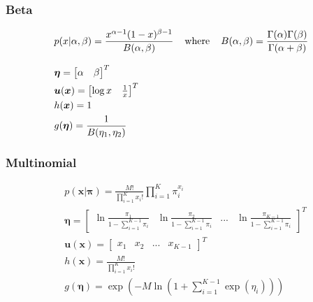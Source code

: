 \subsubsection{Beta}
\begin{fleqn}[\parindent]
	\begin{equation*}
	\begin{split}
	& p(x|\alpha, \beta) = \frac{x^{\alpha-1}(1 - x)^{\beta-1}}{B(\alpha, \beta)} \hspace{4mm}\text{where}\hspace{4mm}B(\alpha, \beta)=\frac{\Gamma(\alpha)\Gamma(\beta)}{\Gamma(\alpha + \beta)}\\[8pt]
	& \bm{\eta} = \begin{bmatrix}
	\alpha & \beta\\
	\end{bmatrix}^T\\
	& \bm{u}(\bm{x}) = \begin{bmatrix}
	\log x & \frac{1}{x}\\
	\end{bmatrix}^T\\
	& h(\bm{x}) = 1\\
	& g(\bm{\eta}) = \frac{1}{B(\eta_1, \eta_2)}\\
	\end{split}
	\end{equation*}
\end{fleqn}
\subsubsection{Multinomial}
\begin{fleqn}[\parindent]
	\begin{equation*}
	\begin{split}
	& p(\bm{x}|\bm{\pi}) = \frac{M!}{\prod_{i=1}^{K}x_i!}\prod_{i=1}^{K}\pi_i^{x_i}\\[8pt]
	& \bm{\eta} = \begin{bmatrix}
	\ln\frac{\pi_1}{1-\sum_{i=1}^{K-1}\pi_i} & \ln\frac{\pi_2}{1-\sum_{i=1}^{K-1}\pi_i} & ... & \ln\frac{\pi_{K-1}}{1-\sum_{i=1}^{K-1}\pi_i}
	\end{bmatrix}^T\\
	& \bm{u}(\bm{x}) = \begin{bmatrix}
	x_1 & x_2 & ... & x_{K-1}
	\end{bmatrix}^T\\
	& h(\bm{x}) = \frac{M!}{\prod_{i=1}^{K}x_i!}\\
	& g(\bm{\eta}) = \exp\left(-M\ln \left(1 + \sum_{i=1}^{K-1}\exp(\eta_i)\right)\right)\\
	\end{split}
	\end{equation*}
\end{fleqn}

